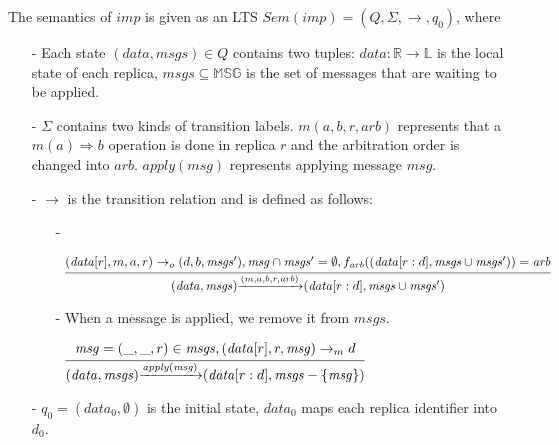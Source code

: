 The semantics of $\mathit{imp}$ is given as an LTS $\mathit{Sem}(\mathit{imp}) = (Q,\Sigma,\rightarrow,q_0)$, where

\begin{itemize}
\setlength{\itemsep}{0.5pt}
\item[-] Each state $(\mathit{data},\mathit{msgs}) \in Q$ contains two tuples: $\mathit{data}: \mathbb{R} \rightarrow \mathbb{L}$ is the local state of each replica, $\mathit{msgs} \subseteq \mathbb{MSG}$ is the set of messages that are waiting to be applied.

\item[-] $\Sigma$ contains two kinds of transition labels. $m(a,b,r,\mathit{arb})$ represents that a $m(a) \Rightarrow b$ operation is done in replica $r$ and the arbitration order is changed into $\mathit{arb}$. $\mathit{apply}(\mathit{msg})$ represents applying message $\mathit{msg}$.

\item[-] $\rightarrow$ is the transition relation and is defined as follows:

    \begin{itemize}
    \setlength{\itemsep}{0.5pt}
    \item[-] %

    $\begin{array}{l c} \bigfrac{ (\mathit{data}[r],m,a,r) \rightarrow_o (d,b,\mathit{msgs}'), \mathit{msg} \cap \mathit{msgs}' = \emptyset, f_{\mathit{arb}}((\mathit{data}[r:d], \mathit{msgs} \cup \mathit{msgs}')) = \mathit{arb}} {(\mathit{data},\mathit{msgs}) {\xrightarrow{(m,a,b,r,\mathit{arb})}} (\mathit{data}[r:d], \mathit{msgs} \cup \mathit{msgs}')} \end{array}$

    \item[-] {\color {red} When a message is applied, we remove it from $\mathit{msgs}$.}

    $\begin{array}{l c} \bigfrac{ \mathit{msg} = (\_,\_,r) \in \mathit{msgs},(\mathit{data}[r],r,\mathit{msg}) \rightarrow_m d } {(\mathit{data},\mathit{msgs}) {\xrightarrow{\mathit{apply}(\mathit{msg})}} (\mathit{data}[r:d],\mathit{msgs} - \{ \mathit{msg} \})} \end{array}$
    \end{itemize}

\item[-] $q_0 = (data_0,\emptyset)$ is the initial state, $data_0$ maps each replica identifier into $d_0$.
\end{itemize}

